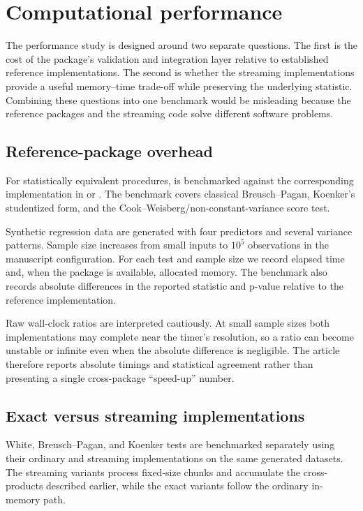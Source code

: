 \section{Computational performance}\label{computational-performance}

The performance study is designed around two separate questions. The first is
the cost of the package's validation and integration layer relative to
established reference implementations. The second is whether the streaming
implementations provide a useful memory--time trade-off while preserving the
underlying statistic. Combining these questions into one benchmark would be
misleading because the reference packages and the streaming code solve
different software problems.

\subsection{Reference-package overhead}\label{reference-package-overhead}

For statistically equivalent procedures,  is benchmarked
against the corresponding implementation in  or
. The benchmark covers classical Breusch--Pagan, Koenker's
studentized form, and the Cook--Weisberg/non-constant-variance score test.

Synthetic regression data are generated with four predictors and several
variance patterns. Sample size increases from small inputs to \(10^5\)
observations in the manuscript configuration. For each test and sample size we
record elapsed time and, when the  package is available,
allocated memory. The benchmark also records absolute differences in the
reported statistic and p-value relative to the reference implementation.

Raw wall-clock ratios are interpreted cautiously. At small sample sizes both
implementations may complete near the timer's resolution, so a ratio can become
unstable or infinite even when the absolute difference is negligible. The
article therefore reports absolute timings and statistical agreement rather
than presenting a single cross-package ``speed-up'' number.

\subsection{Exact versus streaming implementations}\label{exact-versus-streaming-implementations}

White, Breusch--Pagan, and Koenker tests are benchmarked separately using their
ordinary and streaming implementations on the same generated datasets. The
streaming variants process fixed-size chunks and accumulate the cross-products
described earlier, while the exact variants follow the ordinary in-memory path.

